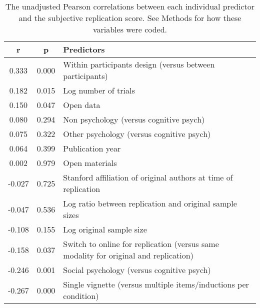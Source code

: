 \documentclass[
  english,
  a4paper,
]{article}
\begin{document}
\begin{table}[!h]

\caption{\label{tab:cor}The unadjusted Pearson correlations between each individual predictor and the subjective replication score. See Methods for how these variables were coded.}
\centering
\fontsize{10}{12}\selectfont
\begin{tabular}[t]{ccl}
\toprule
r & p & Predictors\\
\midrule
0.333 & 0.000 & Within participants design (versus between participants)\\
0.182 & 0.015 & Log number of  trials\\
0.150 & 0.047 & Open data\\
0.080 & 0.294 & Non psychology (versus cognitive psych)\\
0.075 & 0.322 & Other psychology (versus cognitive psych)\\
0.064 & 0.399 & Publication year\\
0.002 & 0.979 & Open materials\\
-0.027 & 0.725 & Stanford affiliation of original authors at time of replication\\
-0.047 & 0.536 & Log ratio between replication and original sample sizes\\
-0.108 & 0.155 & Log original sample size\\
-0.158 & 0.037 & Switch to online for replication (versus same modality for original and replication)\\
-0.246 & 0.001 & Social psychology (versus cognitive psych)\\
-0.267 & 0.000 & Single vignette (versus multiple items/inductions per condition)\\
\bottomrule
\end{tabular}
\end{table}
\end{document}
